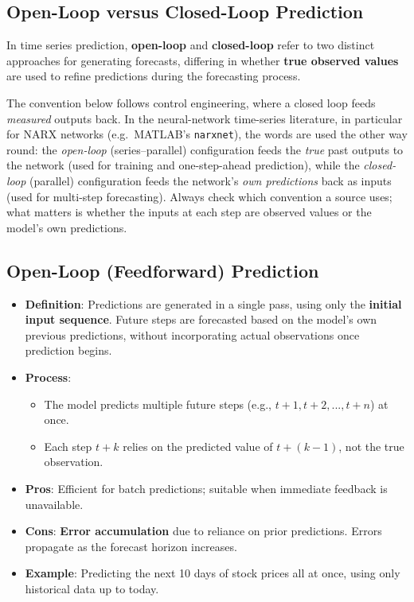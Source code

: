 \begin{notechapter}
\chapter{Open-Loop versus Closed-Loop Prediction}\label{ch:open-closed-loop}

In time series prediction, \textbf{open-loop} and \textbf{closed-loop}
refer to two distinct approaches for generating forecasts, differing in
whether \textbf{true observed values} are used to refine predictions
during the forecasting process.

\begin{remark}
The convention below follows control engineering, where a closed loop feeds \emph{measured} outputs
back. In the neural-network time-series literature, in particular for NARX networks (e.g.\ MATLAB's
\texttt{narxnet}), the words are used the other way round: the \emph{open-loop} (series--parallel)
configuration feeds the \emph{true} past outputs to the network (used for training and one-step-ahead
prediction), while the \emph{closed-loop} (parallel) configuration feeds the network's \emph{own
predictions} back as inputs (used for multi-step forecasting). Always check which convention a source
uses; what matters is whether the inputs at each step are observed values or the model's own
predictions.
\end{remark}

\section{Open-Loop (Feedforward) Prediction}

\begin{itemize}
\tightlist
\item
  \textbf{Definition}: Predictions are generated in a single pass, using
  only the \textbf{initial input sequence}. Future steps are forecasted
  based on the model's own previous predictions, without incorporating
  actual observations once prediction begins.
\item
  \textbf{Process}:

  \begin{itemize}
  \tightlist
  \item
    The model predicts multiple future steps (e.g.,
    \(t+1, t+2, ..., t+n\)) at once.
  \item
    Each step \(t+k\) relies on the predicted value of \(t+(k-1)\), not
    the true observation.
  \end{itemize}
\item
  \textbf{Pros}: Efficient for batch predictions; suitable when
  immediate feedback is unavailable.
\item
  \textbf{Cons}: \textbf{Error accumulation} due to reliance on prior
  predictions. Errors propagate as the forecast horizon increases.
\item
  \textbf{Example}: Predicting the next 10 days of stock prices all at
  once, using only historical data up to today.
\end{itemize}


\end{notechapter}

